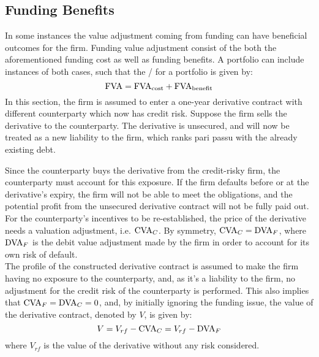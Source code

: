 \documentclass[../main.tex]{subfiles}
\begin{document}
    \subsection{Funding Benefits}
    \label{sec:example-funding-benefit}
        In some instances the value adjustment coming from funding can have beneficial outcomes for the firm. 
        Funding value adjustment consist of the both the aforementioned funding cost as well as funding benefits. 
        A portfolio can include instances of both cases, such that the \FVA/ for a portfolio is given by:
        \begin{equation}
            \FVA/ = \FCA/ + \FBA/
        \end{equation}
        In this section, the firm is assumed to enter a one-year derivative contract 
        with different counterparty
        which now has credit risk.
        Suppose the firm sells the derivative to the counterparty. 
        The derivative is unsecured, and will now be treated as a new liability to the firm, 
        which ranks pari passu with the already existing debt.

        Since the counterparty buys the derivative from the credit-risky firm, 
        the counterparty must account for this exposure. 
        If the firm defaults before or at the derivative's expiry, the firm will not be able to meet the obligations, 
        and the potential profit from the unsecured derivative contract will not be fully paid out. 
        For the counterparty's incentives to be re-established, 
        the price of the derivative needs a valuation adjustment, i.e. $\CVA/_C$. 
        By symmetry, $\CVA/_C = \DVA/_F$, 
        where $\DVA/_F$ is the debit value adjustment made by the firm 
        in order to account for its own risk of default.\\
        The profile of the constructed derivative contract is assumed to make the firm having no exposure to the counterparty,
        and, as it's a liability to the firm, 
        no adjustment for the credit risk of the counterparty is performed. 
        This also implies that $\CVA/_F = \DVA/_C = 0$, 
        and, by initially ignoring the funding issue, the value of the derivative contract, denoted by $V$, is given by:
        \begin{equation}\label{eqn:option-value-credit-risk}
            V = V_{rf} - \CVA/_C = V_{rf} - \DVA/_F
        \end{equation}
        where $V_{rf}$ is the value of the derivative without any risk considered.
\end{document}
